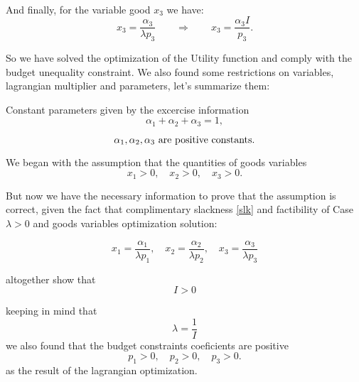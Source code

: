 \documentclass{article}
\begin{document}
\paragraph{}
And finally, for the variable good $x_3$ we have:
\begin{equation}\label{opt3}
  x_3 = \frac{\alpha_3}{\lambda p_3} \qquad \Rightarrow \qquad x_3 = \frac{\alpha_3 I}{ p_3}.
\end{equation}

So we have solved the optimization of the Utility function and comply with the budget unequality constraint. We also found some restrictions on variables, lagrangian multiplier and parameters, let's summarize them:

Constant parameters given by the excercise information
\begin{equation}
  \alpha_1 + \alpha_2 + \alpha_3 = 1,
\end{equation}

\begin{equation}
  \alpha_1, \alpha_2, \alpha_3 \text{  are positive constants.}\\
\end{equation}

\medskip

We began with the assumption that the quantities of goods variables
\begin{equation}
  x_1 > 0, \quad x_2 > 0, \quad x_3 > 0.
\end{equation}

But now we have the necessary information to prove that the assumption is correct, given the fact that complimentary slackness \ref{slk} and factibility of Case $\lambda > 0$ and goods variables optimization solution:

\begin{equation}
  x_1 = \frac{\alpha_1}{\lambda p_1}, \quad x_2 = \frac{\alpha_2}{\lambda p_2}, \quad x_3 = \frac{\alpha_3}{\lambda p_3}
\end{equation}

altogether show that
\begin{equation}
  I > 0
\end{equation}

keeping in mind that
\begin{equation}
  \lambda = \frac{1}{I}
\end{equation}
we also found that the budget constraints coeficients are positive
\begin{equation}
  p_1 > 0, \quad p_2 > 0, \quad  p_3 > 0.
\end{equation}
as the result of the lagrangian optimization.
\end{document}
